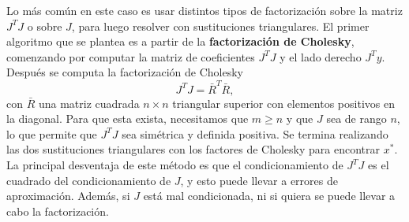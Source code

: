 \documentclass[11pt,a4paper]{book}
\theoremstyle{definition}
\theoremstyle{remark}
\begin{document}
Lo más común en este caso es usar distintos tipos de factorización sobre la matriz $J^TJ$ o sobre $J$, para luego resolver con sustituciones triangulares.
El primer algoritmo que se plantea es a partir de la \textbf{factorización de Cholesky}, comenzando por computar la matriz de coeficientes $J^TJ$ y el lado derecho $J^Ty$. Después se computa la factorización de Cholesky
\begin{equation}
	J^TJ = \bar R^T\bar R,
\end{equation}
con $\bar R$ una matriz cuadrada $n \times n$ triangular superior con elementos positivos en la diagonal. Para que esta exista, necesitamos que $m \geq n$ y que $J$ sea de rango $n$,
lo que permite que $J^TJ$ sea simétrica y definida positiva.
Se termina realizando las dos sustituciones triangulares con los factores de Cholesky para encontrar $x^*$.
La principal desventaja de este método es que el condicionamiento de $J^TJ$ es el cuadrado del condicionamiento de $J$, y esto puede llevar a errores de aproximación.
Además, si $J$ está mal condicionada, ni si quiera se puede llevar a cabo la factorización.
\end{document}
